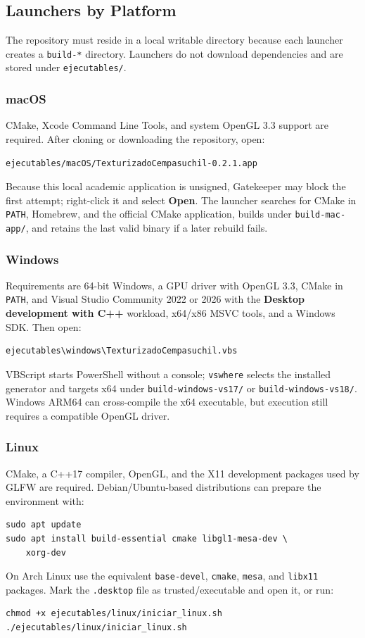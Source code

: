 \documentclass[letter,11pt]{article}
\begin{document}
	\subsection{Launchers by Platform}
	The repository must reside in a local writable directory because each launcher creates a \texttt{build-*} directory. Launchers do not download dependencies and are stored under \texttt{ejecutables/}.
	
	\subsubsection{macOS}
	CMake, Xcode Command Line Tools, and system OpenGL 3.3 support are required. After cloning or downloading the repository, open:
	\begin{lstlisting}[style=terminal]
ejecutables/macOS/TexturizadoCempasuchil-0.2.1.app
	\end{lstlisting}
	Because this local academic application is unsigned, Gatekeeper may block the first attempt; right-click it and select \textbf{Open}. The launcher searches for CMake in \texttt{PATH}, Homebrew, and the official CMake application, builds under \texttt{build-mac-app/}, and retains the last valid binary if a later rebuild fails.

	\subsubsection{Windows}
	Requirements are 64-bit Windows, a GPU driver with OpenGL 3.3, CMake in \texttt{PATH}, and Visual Studio Community 2022 or 2026 with the \textbf{Desktop development with C++} workload, x64/x86 MSVC tools, and a Windows SDK. Then open:
	\begin{lstlisting}[style=terminal]
ejecutables\windows\TexturizadoCempasuchil.vbs
	\end{lstlisting}
	VBScript starts PowerShell without a console; \texttt{vswhere} selects the installed generator and targets x64 under \texttt{build-windows-vs17/} or \texttt{build-windows-vs18/}. Windows ARM64 can cross-compile the x64 executable, but execution still requires a compatible OpenGL driver.

	\subsubsection{Linux}
	CMake, a C++17 compiler, OpenGL, and the X11 development packages used by GLFW are required. Debian/Ubuntu-based distributions can prepare the environment with:
	\begin{lstlisting}[style=bashstyle,numbers=none]
sudo apt update
sudo apt install build-essential cmake libgl1-mesa-dev \
    xorg-dev
	\end{lstlisting}
	On Arch Linux use the equivalent \texttt{base-devel}, \texttt{cmake}, \texttt{mesa}, and \texttt{libx11} packages. Mark the \texttt{.desktop} file as trusted/executable and open it, or run:
	\begin{lstlisting}[style=bashstyle,numbers=none]
chmod +x ejecutables/linux/iniciar_linux.sh
./ejecutables/linux/iniciar_linux.sh
	\end{lstlisting}
\end{document}

